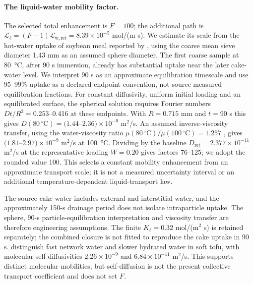 \paragraph{The liquid-water mobility factor.}
The selected total enhancement is $F=100$; the additional path is
$\mathcal L_\ell=(F-1)\mathcal L_{\mathrm{w,ret}}
=8.39\times10^{-5}$ mol/(m s). We estimate its scale from the hot-water
uptake of soybean meal reported by \citet{hemmingsen2008water}, using
the coarse mean sieve diameter 1.43 mm as an assumed sphere diameter.
The first coarse sample at \SI{80}{\celsius}, after 90 s immersion,
already has substantial uptake near the later cake-water level.
We interpret 90 s as an approximate equilibration timescale and use
95--99\% uptake as a declared endpoint convention, not source-measured
equilibration fractions. For constant diffusivity, uniform initial loading
and an equilibrated surface, the spherical solution \citep{crank1956diffusion}
requires Fourier numbers $Dt/R^2=0.253$--0.416 at these endpoints.
With $R=0.715$ mm and $t=90$ s this gives
$D(80\,^\circ\mathrm C)=(1.44$--$2.36)\times10^{-9}$ m$^2$/s.
An assumed inverse-viscosity transfer, using the water-viscosity ratio
$\mu(80\,^\circ\mathrm C)/\mu(100\,^\circ\mathrm C)=1.257$
\citep[eq.~7]{iapws2011liquidwater}, gives
$(1.81$--$2.97)\times10^{-9}$ m$^2$/s at \SI{100}{\celsius}.
Dividing by the baseline $D_{\mathrm{ret}}=2.377\times10^{-11}$ m$^2$/s
at the representative loading $W=0.20$ gives factors 76--125; we adopt
the rounded value 100. This selects a constant mobility enhancement from
an approximate transport scale; it is not a measured uncertainty interval
or an additional temperature-dependent liquid-transport law.

The source cake water includes external and interstitial water, and the
approximately 150-s drainage period does not isolate intraparticle uptake.
The sphere, 90-s particle-equilibration interpretation and viscosity
transfer are therefore engineering assumptions. The finite
$K_\ell=0.32$ mol/(m$^2$ s) is retained separately; the combined closure
is not fitted to reproduce the cake uptake in 90 s.
\citet{hong2006selfdiffusion} distinguish fast network water and slower
hydrated water in soft tofu, with molecular self-diffusivities
$2.26\times10^{-9}$ and $6.84\times10^{-11}$ m$^2$/s. This supports
distinct molecular mobilities, but self-diffusion is not the present
collective transport coefficient and does not set $F$.

